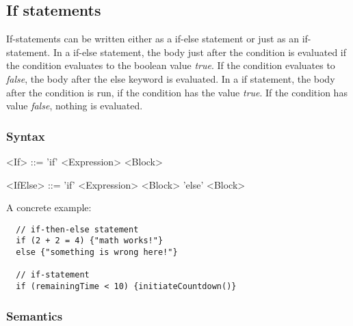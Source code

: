 \subsection{If statements}
\label{subsec:ifStatements}

If-statements can be written either as a if-else statement or just as an if-statement. In a if-else statement, the body just after the condition is evaluated if the condition evaluates to the boolean value \emph{true}. If the condition evaluates to \emph{false}, the body after the else keyword is evaluated. In a if statement, the body after the condition is run, if the condition has the value \emph{true}. If the condition has value \emph{false}, nothing is evaluated.

\subsubsection{Syntax}

\begin{grammar}
<If> ::= 'if' <Expression> <Block>

<IfElse> ::= 'if' <Expression> <Block> 'else' <Block>
\end{grammar}

A concrete example:

\begin{verbatim}
  // if-then-else statement
  if (2 + 2 = 4) {"math works!"}
  else {"something is wrong here!"}

  // if-statement
  if (remainingTime < 10) {initiateCountdown()}
\end{verbatim}

\subsubsection{Semantics}

